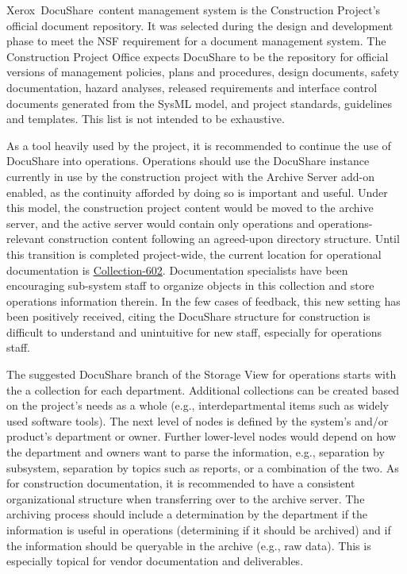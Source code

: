 Xerox\textregistered\ DocuShare\textregistered\ content management system \citep{DocuShare-cite} is the Construction Project's official document repository.
It was selected during the design and development phase to meet the NSF requirement for a document management system.
The Construction Project Office expects DocuShare to be the repository for official versions of management policies, plans and procedures, design documents, safety documentation, hazard analyses, released requirements and interface control documents generated from the SysML model, and project standards, guidelines and templates.
This list is not intended to be exhaustive.

As a tool heavily used by the project, it is recommended to continue the use of DocuShare into operations.
Operations should use the DocuShare instance currently in use by the construction project with the Archive Server add-on enabled, as the continuity afforded by doing so is important and useful.
Under this model, the construction project content would be moved to the archive server, and the active server would contain only operations and operations-relevant construction content following an agreed-upon directory structure.
Until this transition is completed project-wide, the current location for operational documentation is \href{https://docushare.lsstcorp.org/docushare/dsweb/View/Collection-602}{Collection-602}.
Documentation specialists have been encouraging sub-system staff to organize objects in this collection and store operations information therein.
In the few cases of feedback, this new setting has been positively received, citing the DocuShare structure for construction is difficult to understand and unintuitive for new staff, especially for operations staff.

The suggested DocuShare branch of the Storage View for operations starts with the a collection for each department.
Additional collections can be created based on the project's needs as a whole (e.g., interdepartmental items such as widely used software tools).
The next level of nodes is defined by the system's and/or product's department or owner.
Further lower-level nodes would depend on how the department and owners want to parse the information, e.g., separation by subsystem, separation by topics such as reports, or a combination of the two.
As for construction documentation, it is recommended to have a consistent organizational structure when transferring over to the archive server.
The archiving process should include a determination by the department if the information is useful in operations (determining if it should be archived) and if the information should be queryable in the archive (e.g., raw data).
This is especially topical for vendor documentation and deliverables.

